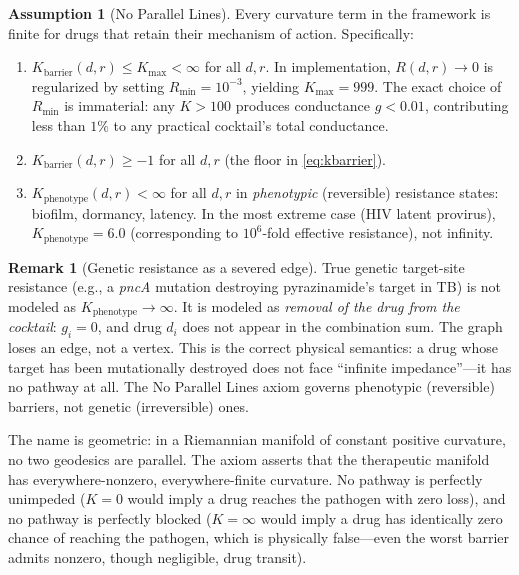 \documentclass[11pt]{article}
\theoremstyle{plain}
\theoremstyle{definition}
\newtheorem{remark}[theorem]{Remark}
\newtheorem{assumption}[theorem]{Assumption}
\newcommand{\Kbarr}{K_{\mathrm{barrier}}}
\newcommand{\Kpheno}{K_{\mathrm{phenotype}}}
\begin{document}
\begin{assumption}[No Parallel Lines]
\label{ax:no-parallel-lines}
Every curvature term in the framework is finite for drugs that
retain their mechanism of action. Specifically:
\begin{enumerate}[label=(\roman*)]
  \item $\Kbarr(d, r) \leq K_{\max} < \infty$ for all $d, r$.
    In implementation, $R(d,r) \to 0$ is regularized by setting
    $R_{\min} = 10^{-3}$, yielding $K_{\max} = 999$. The exact
    choice of $R_{\min}$ is immaterial: any $K > 100$ produces
    conductance $g < 0.01$, contributing less than $1\%$ to any
    practical cocktail's total conductance.
  \item $\Kbarr(d, r) \geq -1$ for all $d, r$ (the floor in
    \cref{eq:kbarrier}).
  \item $\Kpheno(d, r) < \infty$ for all $d, r$ in
    \emph{phenotypic} (reversible) resistance states: biofilm,
    dormancy, latency. In the most extreme case (HIV latent
    provirus), $\Kpheno = 6.0$ (corresponding to $10^6$-fold
    effective resistance), not infinity.
\end{enumerate}
\end{assumption}

\begin{remark}[Genetic resistance as a severed edge]
\label{rem:genetic-resistance}
True genetic target-site resistance (e.g., a \emph{pncA} mutation
destroying pyrazinamide's target in TB) is not modeled as
$\Kpheno \to \infty$. It is modeled as \emph{removal of the drug
from the cocktail}: $g_i = 0$, and drug $d_i$ does not appear in
the combination sum. The graph loses an edge, not a vertex. This
is the correct physical semantics: a drug whose target has been
mutationally destroyed does not face ``infinite impedance''---it
has no pathway at all. The No Parallel Lines axiom governs
phenotypic (reversible) barriers, not genetic (irreversible) ones.
\end{remark}

The name is geometric: in a Riemannian manifold of constant
positive curvature, no two geodesics are parallel. The axiom
asserts that the therapeutic manifold has everywhere-nonzero,
everywhere-finite curvature. No pathway is perfectly unimpeded
($K = 0$ would imply a drug reaches the pathogen with zero loss),
and no pathway is perfectly blocked ($K = \infty$ would imply a
drug has identically zero chance of reaching the pathogen, which
is physically false---even the worst barrier admits nonzero, though
negligible, drug transit).
\end{document}
